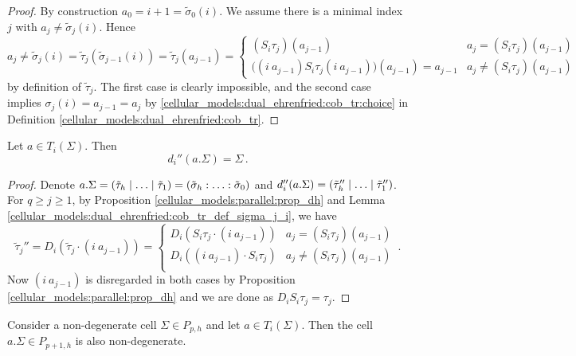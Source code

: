 \begin{proof}
    By construction $a_0 = i+1 = \tilde\sigma_0(i)$.
    We assume there is a minimal index $j$ with $a_j \neq \tilde\sigma_j(i)$.
    Hence
    \[
        a_j \neq \tilde\sigma_j(i) =
            \tilde\tau_j(\tilde\sigma_{j-1}(i)) =
            \tilde\tau_j(a_{j-1}) =
            \begin{cases}
                (S_i\tau_j)(a_{j-1})                                    & a_j = (S_i\tau_j)(a_{j-1}) \\
                \big( (i\ a_{j-1}) S_i\tau_j (i\ a_{j-1}) \big)(a_{j-1}) = a_{j-1}  & a_j \neq (S_i\tau_j)(a_{j-1})
            \end{cases}
    \]
    by definition of $\tilde\tau_j$.
    The first case is clearly impossible, and the second case implies $\sigma_j(i) = a_{j-1} = a_j$ by \ref{cellular_models:dual_ehrenfried:cob_tr:choice} in Definition \ref{cellular_models:dual_ehrenfried:cob_tr}.
\end{proof}

\begin{lem}
    \label{cellular_models:dual_ehrenfried:a_Sigma_is_cob}
    Let $a \in T_i(\Sigma)$.
    Then
    \[
        d_i''(a.\Sigma) = \Sigma \,.
    \]
\end{lem}

\begin{proof}
    Denote $a.\Sigma = \inhom[\tilde\tau] = \homog[\tilde\sigma]$ and $d_i''(a.\Sigma) = \inhom[\tilde\tau'']$.
    For $q \ge j \ge 1$, by Proposition \ref{cellular_models:parallel:prop_dh} and Lemma \ref{cellular_models:dual_ehrenfried:cob_tr_def_sigma_j_i},
    we have
    \[
        \tilde\tau_j'' = D_i( \tilde\tau_j \cdot (i\ a_{j-1})) = 
            \begin{cases}
                D_i( S_i\tau_j \cdot (i\ a_{j-1})) & a_j = (S_i\tau_j)(a_{j-1}) \\
                D_i( (i\ a_{j-1}) \cdot S_i\tau_j) & a_j \neq (S_i\tau_j)(a_{j-1}) \\
            \end{cases} \,.
    \]
    Now $(i\ a_{j-1})$ is disregarded in both cases by Proposition \ref{cellular_models:parallel:prop_dh} and we are done as $D_iS_i\tau_j = \tau_j$.
\end{proof}

\begin{lem}
    \label{cellular_models:dual_ehrenfried:a_Sigma_is_non_deg}
    Consider a non-degenerate cell $\Sigma \in P_{p,h}$ and let $a \in T_i(\Sigma)$.
    Then the cell $a.\Sigma \in P_{p+1,h}$ is also non-degenerate.
\end{lem}

